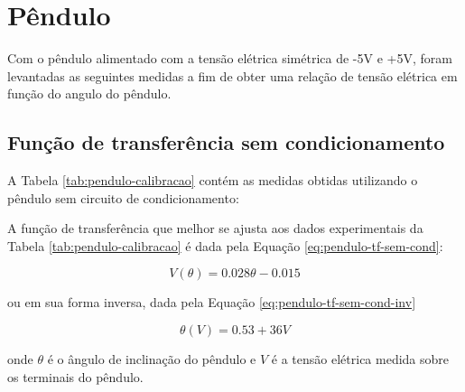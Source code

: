 \documentclass[a4paper]{instrumentacao}
\begin{document}
\section{Pêndulo}

Com o pêndulo alimentado com a tensão elétrica simétrica de -5V e +5V, foram levantadas as seguintes medidas a fim de obter uma relação de tensão elétrica em função do angulo do pêndulo. 

\subsection{Função de transferência sem condicionamento}
A Tabela \ref{tab:pendulo-calibracao} contém as medidas obtidas utilizando o pêndulo sem circuito de condicionamento:

A função de transferência que melhor se ajusta aos dados experimentais da Tabela \ref{tab:pendulo-calibracao} é dada pela Equação \ref{eq:pendulo-tf-sem-cond}:

\begin{equation}
	V(\theta) = 0.028 \theta - 0.015
	\label{eq:pendulo-tf-sem-cond}
\end{equation}

\noindent 
ou em sua forma inversa, dada pela Equação \ref{eq:pendulo-tf-sem-cond-inv}

\begin{equation}
	\theta(V) = 0.53 + 36 V
	\label{eq:pendulo-tf-sem-cond-inv}
\end{equation}

\noindent
onde $\theta$ é o ângulo de inclinação do pêndulo e $V$ é a tensão elétrica medida sobre os terminais do pêndulo.
\end{document}
